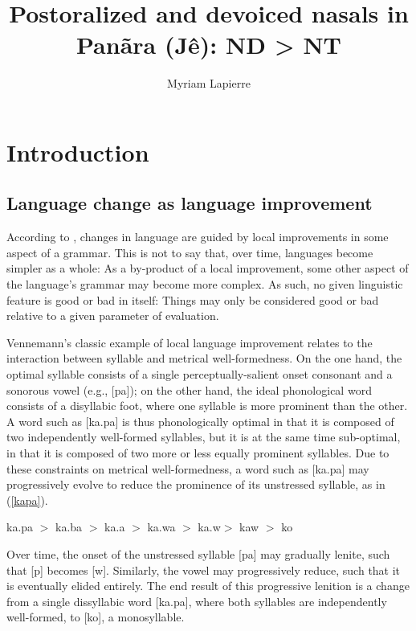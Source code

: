 \documentclass[output=paper,hidelinks]{langscibook}
\author{Myriam Lapierre\affiliation{University of Washington}}
\title{Postoralized and devoiced nasals in Panãra (Jê): ND > NT}
\begin{document}
\maketitle

\section{Introduction}\label{sec:lapierre:1}
\subsection{Language change as language improvement}

According to \citet{Vennemann1993}, changes in language are guided by local improvements in some aspect of a grammar. This is not to say that, over time, languages become simpler as a whole: As a by-product of a local improvement, some other aspect of the language's grammar may become more complex. As such, no given linguistic feature is good or bad in itself: Things may only be considered good or bad relative to a given parameter of evaluation. 

Vennemann's classic example of local language improvement relates to the interaction between syllable and metrical well-formedness. On the one hand, the optimal syllable consists of a single perceptually-salient onset consonant and a sonorous vowel (e.g., [pa]); on the other hand, the ideal phonological word consists of a disyllabic foot, where one syllable is more prominent than the other. A word such as [\textprimstress ka.pa] is thus phonologically optimal in that it is composed of two independently well-formed syllables, but it is at the same time sub-optimal, in that it is composed of two more or less equally prominent syllables. Due to these constraints on metrical well-formedness, a word such as [\textprimstress ka.pa] may progressively evolve to reduce the prominence of its unstressed syllable, as in (\ref{kapa}).

\ea\label{kapa} \textprimstress ka.pa $>$ \textprimstress ka.ba $>$ \textprimstress ka.\textbeta a $>$ \textprimstress ka.wa $>$ \textprimstress ka.w\textschwa $>$ kaw $>$ ko
\z

Over time, the onset of the unstressed syllable [pa] may gradually lenite, such that [p] becomes [w]. Similarly, the vowel may progressively reduce, such that it is eventually elided entirely. The end result of this progressive lenition is a change from a single dissyllabic word [\textprimstress ka.pa], where both syllables are independently well-formed, to [ko], a monosyllable. 
\end{document}

